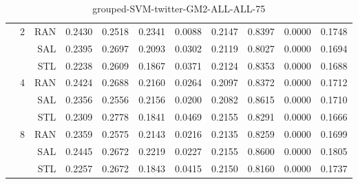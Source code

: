 \begin{center}
\begin{table}[htbp]
\begin{center}
\begin{tabular}{ | r | r | r | r | r | r | r | r | r | r | r |}
 & \multirow{3}{*}{2} & RAN & 0.2430 & 0.2518 & 0.2341 & 0.0088 & 0.2147 & 0.8397 & 0.0000 & 0.1748\\ \cline{3-11}
 &   & SAL & 0.2395 & 0.2697 & 0.2093 & 0.0302 & 0.2119 & 0.8027 & 0.0000 & 0.1694\\ \cline{3-11}
 &   & STL & 0.2238 & 0.2609 & 0.1867 & 0.0371 & 0.2124 & 0.8353 & 0.0000 & 0.1688\\ \cline{2-11}
 & \multirow{3}{*}{4} & RAN & 0.2424 & 0.2688 & 0.2160 & 0.0264 & 0.2097 & 0.8372 & 0.0000 & 0.1712\\ \cline{3-11}
 &   & SAL & 0.2356 & 0.2556 & 0.2156 & 0.0200 & 0.2082 & 0.8615 & 0.0000 & 0.1710\\ \cline{3-11}
 &   & STL & 0.2309 & 0.2778 & 0.1841 & 0.0469 & 0.2155 & 0.8291 & 0.0000 & 0.1666\\ \cline{2-11}
 & \multirow{3}{*}{8} & RAN & 0.2359 & 0.2575 & 0.2143 & 0.0216 & 0.2135 & 0.8259 & 0.0000 & 0.1699\\ \cline{3-11}
 &   & SAL & 0.2445 & 0.2672 & 0.2219 & 0.0227 & 0.2155 & 0.8600 & 0.0000 & 0.1805\\ \cline{3-11}
 &   & STL & 0.2257 & 0.2672 & 0.1843 & 0.0415 & 0.2150 & 0.8160 & 0.0000 & 0.1737\\ \cline{2-11}
\hline
\end{tabular}
\caption{grouped-SVM-twitter-GM2-ALL-ALL-75}
\end{center}
 \end{table}
\end{center}

